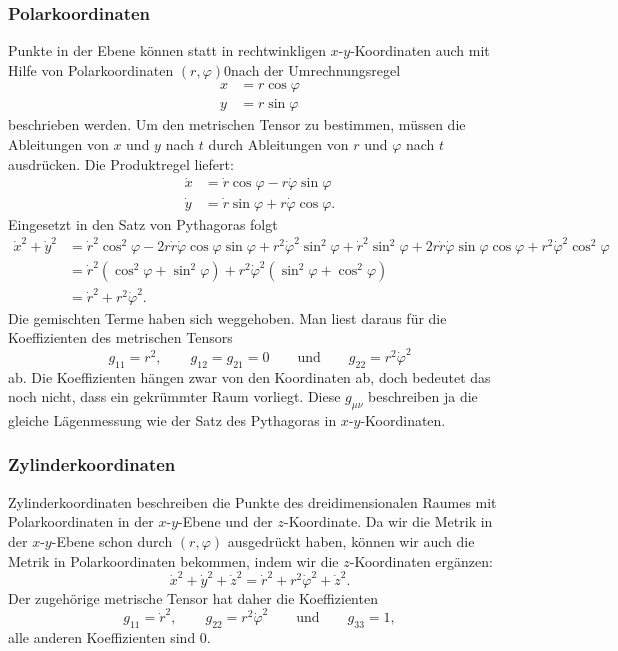 \subsubsection{Polarkoordinaten}
Punkte in der Ebene können statt in rechtwinkligen $x$-$y$-Koordinaten
auch mit Hilfe von Polarkoordinaten $(r,\varphi)$0nach der Umrechnungsregel
\begin{align*}
x&=r\cos\varphi\\
y&=r\sin\varphi
\end{align*}
beschrieben werden.
Um den metrischen Tensor zu bestimmen, müssen die Ableitungen von $x$ 
und $y$ nach $t$ durch Ableitungen von $r$ und $\varphi$ nach $t$ 
ausdrücken.
Die Produktregel liefert:
\begin{align*}
\dot x&= \dot r\cos \varphi - r\dot\varphi \sin\varphi 
\\
\dot y&= \dot r\sin\varphi + r\dot\varphi\cos\varphi.
\end{align*}
Eingesetzt in den Satz von Pythagoras folgt
\begin{align*}
\dot x^2 + \dot y^2
&=
\dot r^2\cos^2\varphi -2r\dot r\dot\varphi\cos\varphi\sin\varphi +r^2\dot \varphi^2\sin^2\varphi
+
\dot r^2\sin^2\varphi +2r\dot r\dot\varphi\sin\varphi\cos\varphi +r^2\dot\varphi^2\cos^2\varphi
\\
&=
\dot r^2(\cos^2\varphi+\sin^2\varphi)+ r^2\dot\varphi^2(\sin^2\varphi+\cos^2\varphi)
\\
&=\dot r^2 + r^2\dot\varphi^2.
\end{align*}
Die gemischten Terme haben sich weggehoben.
Man liest daraus für die Koeffizienten des metrischen Tensors
\[
g_{11}=r^2,\qquad g_{12}=g_{21}=0\qquad\text{und}\qquad g_{22}=r^2\dot\varphi^2
\]
ab.
Die Koeffizienten hängen zwar von den Koordinaten ab, doch bedeutet
das noch nicht, dass ein gekrümmter Raum vorliegt.
Diese $g_{\mu\nu}$ beschreiben ja die gleiche Lägenmessung wie der Satz
des Pythagoras in $x$-$y$-Koordinaten.

\subsubsection{Zylinderkoordinaten}
Zylinderkoordinaten beschreiben die Punkte des dreidimensionalen
Raumes mit Polarkoordinaten in der $x$-$y$-Ebene und der $z$-Koordinate.
Da wir die Metrik in der $x$-$y$-Ebene schon durch $(r,\varphi)$
ausgedrückt haben, können wir auch die Metrik in Polarkoordinaten
bekommen, indem wir die $z$-Koordinaten ergänzen:
\[
\dot x^2+\dot y^2 +\dot z^2
=
\dot r^2 + r^2\dot\varphi^2 + \dot z^2.
\]
Der zugehörige metrische Tensor hat daher die Koeffizienten
\[
g_{11}=\dot r^2,\qquad
g_{22}=r^2\dot\varphi^2
\qquad\text{und}\qquad
g_{33}=1,
\]
alle anderen Koeffizienten sind $0$.

